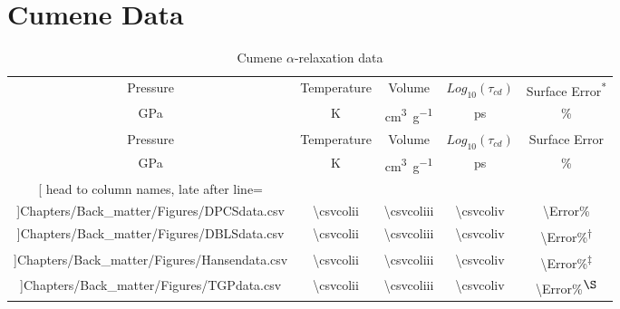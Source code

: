 \chapter{Cumene Data} \label{app:DPCSdata}
\begin{longtable}{ccccc}
	\caption{Cumene $\alpha$\--relaxation data}\label{table:DPCSdata}\\
	\toprule
	Pressure & Temperature & Volume & $Log_{10}(\tau_{cd})$ & Surface Error\textsuperscript{*} \\
	\si{\GPa} & \si{\kelvin} & \si{\cubic\centi\meter\per\gram} & \si{\pico\second} & \% \\
	\midrule
	\endfirsthead
	
	\toprule
	Pressure & Temperature & Volume & $Log_{10}(\tau_{cd})$ & Surface Error \\
	\si{\GPa} & \si{\kelvin} & \si{\cubic\centi\meter\per\gram} & \si{\pico\second} & \% \\
	\midrule
	\endhead
	
	\bottomrule
	\endfoot
	
	\csvreader[
	head to column names,
	late after line=\\
	]{Chapters/Back_matter/Figures/DPCSdata.csv}{}%
	{
		\num[round-mode=places,round-precision=2]{\csvcoli} &
		\num[round-mode=places,round-precision=2]{\csvcolii} &
		\num[round-mode=places,round-precision=3]{\csvcoliii} &
		\num[round-mode=places,round-precision=2]{\csvcoliv} &
		\num[round-mode=places,round-precision=2]{\Error}\%
	}
	
	\csvreader[
	head to column names,
	late after line=\\
	]{Chapters/Back_matter/Figures/DBLSdata.csv}{}%
	{
		\num[round-mode=places,round-precision=2]{\csvcoli} &
		\num[round-mode=places,round-precision=2]{\csvcolii} &
		\num[round-mode=places,round-precision=3]{\csvcoliii} &
		\num[round-mode=places,round-precision=2]{\csvcoliv} &
		\num[round-mode=places,round-precision=2]{\Error}\%\textsuperscript{$\dagger$}
	}
	
	\csvreader[
	head to column names,
	late after line=\\
	]{Chapters/Back_matter/Figures/Hansendata.csv}{}%
	{
		\num[round-mode=places,round-precision=2]{\csvcoli} &
		\num[round-mode=places,round-precision=2]{\csvcolii} &
		\num[round-mode=places,round-precision=3]{\csvcoliii} &
		\num[round-mode=places,round-precision=2]{\csvcoliv} &
		\num[round-mode=places,round-precision=2]{\Error}\%\textsuperscript{$\ddagger$}
	}
	
	\csvreader[
	head to column names,
	late after line=\\
	]{Chapters/Back_matter/Figures/TGPdata.csv}{}%
	{
		\num[round-mode=places,round-precision=2]{\csvcoli} &
		\num[round-mode=places,round-precision=2]{\csvcolii} &
		\num[round-mode=places,round-precision=3]{\csvcoliii} &
		\num[round-mode=places,round-precision=2]{\csvcoliv} &
		\num[round-mode=places,round-precision=2]{\Error}\%\textsuperscript{$\S$}
	}
	
\end{longtable}

